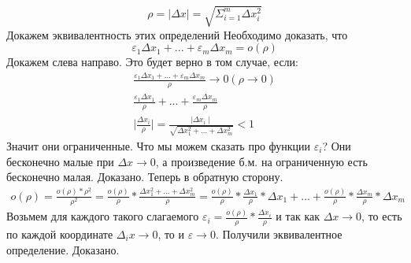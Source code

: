 $$
\rho = |\Delta x| = \sqrt{\Sigma^m_{i = 1}{\Delta x_i^2}}
$$
Докажем эквивалентность этих определений
Необходимо доказать, что
$$
\varepsilon_1 \Delta x_1 + ... + \varepsilon_m \Delta x_m = o(\rho)
$$
Докажем слева направо. Это будет верно в том случае, если:
\begin{gather*}
\frac{\varepsilon_1 \Delta x_1 + ... + \varepsilon_m \Delta x_m}{\rho} \rightarrow 0 (\rho \rightarrow 0)
\\
\frac{\varepsilon_1 \Delta x_1}{\rho} + ... + \frac{\varepsilon_m \Delta x_m}{\rho}
\\
\mid\frac{\Delta x_i}{\rho}\mid = \frac{\mid\Delta x_i \mid}{\sqrt{\Delta x_1^2 + ... + \Delta x_m^2}} < 1
\end{gather*}
Значит они ограниченные. Что мы можем сказать про функции $\varepsilon_i$? Они бесконечно малые при $\Delta x \rightarrow 0$, а произведение б.м. на ограниченную есть бесконечно малая. Доказано. Теперь в обратную сторону.
\\
\begin{gather*}
    o(\rho) = \frac{o(\rho) * \rho^2}{\rho^2} = \frac{o(\rho)}{\rho} * \frac{\Delta x_1^2 + ... + \Delta x_m^2}{\rho} = \frac{o(\rho)}{\rho} * \frac{\Delta x_1}{\rho} * \Delta x_1 + ... + \frac{o(\rho)}{\rho} * \frac{\Delta x_m}{\rho} * \Delta x_m
\end{gather*}
Возьмем для каждого такого слагаемого $\varepsilon_i = \frac{o(\rho)}{\rho} * \frac{\Delta x_i}{\rho}$ и так как $\Delta x \to 0$, то есть по каждой координате $\Delta_i x \to 0$, то и $\varepsilon \to 0$. Получили эквивалентное определение. Доказано.


